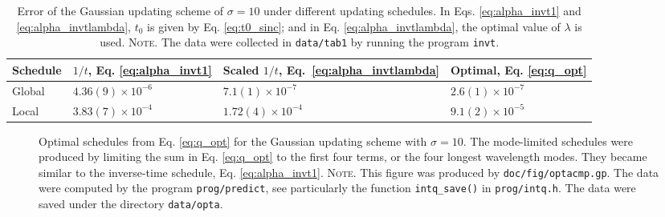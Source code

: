 \documentclass[reprint, superscriptaddress, floatfix]{revtex4-1}
\newcommand{\note}[1]{{\color{DarkGreen}\footnotesize \textsc{Note.} #1}}
\begin{document}
\begin{table}[h]\footnotesize
  \caption{\label{tab:error_Gaussian}
    Error of the Gaussian updating scheme of $\sigma = 10$
    under different updating schedules.
    In Eqs. \eqref{eq:alpha_invt1} and \eqref{eq:alpha_invtlambda},
    $t_0$ is given by Eq. \eqref{eq:t0_sinc};
    and in Eq. \eqref{eq:alpha_invtlambda},
    the optimal value of $\lambda$ is used.
    \note{\newline
      The data were collected in
      \texttt{data/tab1} by running
      the program \texttt{invt}.
    }%
  }
  \setlength{\tabcolsep}{2pt}
  \renewcommand\arraystretch{1.2}
  \begin{tabular} { l | p{2.2cm} p{2.4cm} p{2.0cm} }
    \hline
      Schedule
    &
      $1/t$, \newline
      Eq. \eqref{eq:alpha_invt1}
    &
      Scaled $1/t$, \newline
      Eq.~\eqref{eq:alpha_invtlambda}
    &
      Optimal, \newline
      Eq. \eqref{eq:q_opt}
    \\
    \hline
    Global
    &
    $4.36(9) \times 10^{-6}$
    &
    $7.1(1) \times 10^{-7}$
    &
    $2.6(1) \times 10^{-7}$
    \\
    \hline
    Local
    &
    $3.83(7) \times 10^{-4}$
    &
    $1.72(4) \times 10^{-4}$
    &
    $9.1(2) \times 10^{-5}$
    \\
    \hline
  \end{tabular}
\end{table}


\begin{figure}[h]
\begin{center}
  \caption{
    \label{fig:optacmp}
    Optimal schedules from Eq. \eqref{eq:q_opt}
    for the Gaussian updating scheme
    with $\sigma = 10$.
    The mode-limited schedules were produced by
    limiting the sum in Eq. \eqref{eq:q_opt}
    to the first four terms,
    or the four longest wavelength modes.
    They became similar to the inverse-time schedule,
    Eq. \eqref{eq:alpha_invt1}.
    \note{This figure was produced by \texttt{doc/fig/optacmp.gp}.
      The data were computed by the program \texttt{prog/predict},
      see particularly the function \texttt{intq\_save()}
      in \texttt{prog/intq.h}.
      The data were saved under the directory \texttt{data/opta}.
    }%
  }
\end{center}
\end{figure}
\end{document}

